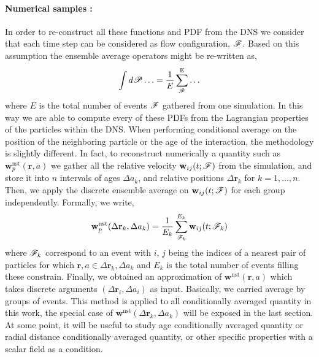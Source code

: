 \paragraph*{Numerical samples :}
In order to re-construct all these functions and PDF from the DNS we consider that each time step can be considered as flow configuration, $\mathscr{F}$. 
Based on this assumption the ensemble average operators might be re-written as, 
\begin{equation}
    \int  d\mathscr{P}\ldots
    = \frac{1}{E}\sum_{\mathscr{F}}^\text{E} \ldots 
    \label{eq:discrete_ensemble_average}
\end{equation}
where $E$ is the total number of events $\mathscr{F}$ gathered from one simulation.  
In this way we are able to compute every of these PDFs from the Lagrangian properties of the particles within the DNS. 
When performing conditional average on the position of the neighboring particle or the age of the interaction, the methodology is slightly different. 
In fact, to reconstruct numerically a quantity such as $\textbf{w}^\text{nst}_p(\textbf{r},a)$ we gather all the relative velocity $\textbf{w}_{ij}(t;\mathscr{F})$ from the simulation, and store it into $n$ intervals of ages $\Delta a_k$, and relative positions $\Delta \textbf{r}_k$ for $k = 1,\ldots, n$.
Then, we apply the discrete ensemble average on $\textbf{w}_{ij}(t;\mathscr{F})$ for each group independently.
Formally, we write, 
\begin{equation}
    \textbf{w}^\text{nst}_p(\Delta\textbf{r}_k,\Delta a_k)
    = \frac{1}{E_k} 
    \sum^{E_k}_{\mathscr{F}_k} 
    \textbf{w}_{ij}(t;\mathscr{F}_k)
    \label{eq:vec_cond}
\end{equation}
where $\mathscr{F}_k$ correspond to an event with $i$, $j$ being the indices of a nearest pair of particles for which $\textbf{r},a \in \Delta \textbf{r}_k ,\Delta a_k$ and $E_k$ is the total number of events filling these constrain. 
Finally, we obtained an approximation of $\textbf{w}^\text{nst}(\textbf{r},a)$ which takes discrete arguments $(\Delta\textbf{r}_i,\Delta a_i)$ as input.
Basically, we carried average by groups of events.  
This method is applied to all conditionally averaged quantity in this work, the special case of $\textbf{w}^\text{nst}(\Delta\textbf{r}_k,\Delta a_k)$ will be exposed in the last section. 
At some point, it will be useful to study age conditionally averaged quantity or radial distance conditionally averaged quantity, or other specific properties with a scalar field as a condition. 
